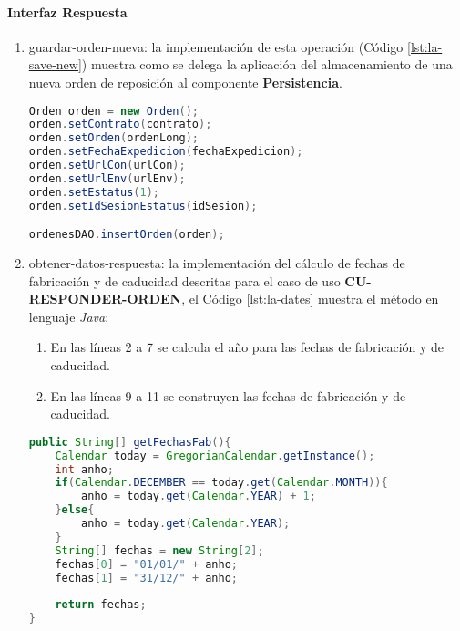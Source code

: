 \paragraph{\indent Interfaz Respuesta}
\begin{enumerate}
	\item guardar-orden-nueva: la implementación de esta operación (Código \ref{lst:la-save-new}) muestra como se delega la aplicación del almacenamiento de una nueva orden de reposición al componente \textbf{Persistencia}.
	\begin{lstlisting}[language=Java, caption={Delegación del almacenamiento de una nueva orden de reposición.}, captionpos=b, label={lst:la-save-new}]
Orden orden = new Orden();
orden.setContrato(contrato);
orden.setOrden(ordenLong);
orden.setFechaExpedicion(fechaExpedicion);
orden.setUrlCon(urlCon);
orden.setUrlEnv(urlEnv);
orden.setEstatus(1);
orden.setIdSesionEstatus(idSesion);

ordenesDAO.insertOrden(orden);
	\end{lstlisting}

	\item obtener-datos-respuesta: la implementación del cálculo de fechas de fabricación y de caducidad descritas para el caso de uso \textbf{CU-RESPONDER-ORDEN}, el Código \ref{lst:la-dates} muestra el método en lenguaje \textit{Java}:
	\begin{enumerate}
		\item En las líneas 2 a 7 se calcula el año para las fechas de fabricación y de caducidad.
		\item En las líneas 9 a 11 se construyen las fechas de fabricación y de caducidad.
	\end{enumerate}
	\begin{lstlisting}[language=Java, caption={Método para calcular las fechas de fabricación y caducidad.}, captionpos=b, label={lst:la-dates}]
public String[] getFechasFab(){
	Calendar today = GregorianCalendar.getInstance();
	int anho;
	if(Calendar.DECEMBER == today.get(Calendar.MONTH)){
		anho = today.get(Calendar.YEAR) + 1;
	}else{
		anho = today.get(Calendar.YEAR);
	}
	String[] fechas = new String[2];
	fechas[0] = "01/01/" + anho;
	fechas[1] = "31/12/" + anho;
	
	return fechas;
}
	\end{lstlisting}


\end{enumerate}
